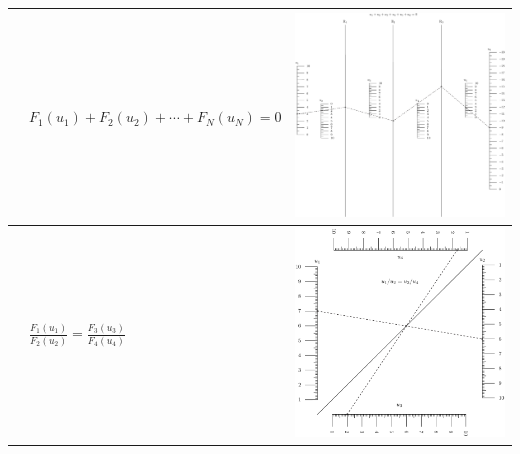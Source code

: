 \documentclass[a4paper,11pt,english]{sphinxmanual}
\begin{document}
\begin{tabulary}{\linewidth}{|L|L|L|}
\\
\hline
{\hyperref[types/types:type3-ref]{\emph{}}}
 & 
\(F_1(u_1)+F_2(u_2)+\cdots+F_N(u_N)=0\)
 & 
\includegraphics{ex_type3_nomo_1.pdf}
\\
\hline
{\hyperref[types/types:type4-ref]{\emph{}}}
 & 
\(\frac{F_1(u_1)}{F_2(u_2)}=\frac{F_3(u_3)}{F_4(u_4)}\)
 & 
\includegraphics{ex_type4_nomo_1.pdf}

\end{tabulary}
\end{document}
